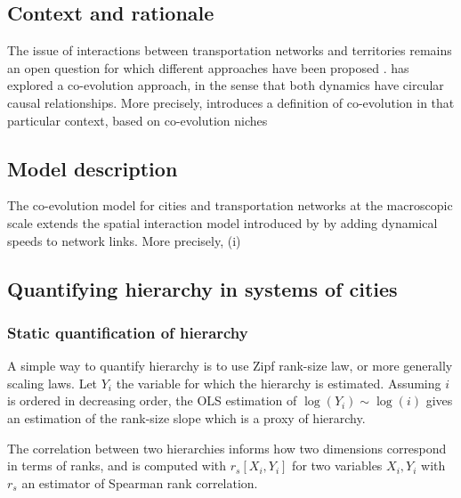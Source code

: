 \documentclass[english,fleqn,allpages]{ISTE_science}[2018/07/30]
\begin{document}
\subsection{Context and rationale}

The issue of interactions between transportation networks and territories remains an open question for which different approaches have been proposed \cite{offner1993effets,espacegeo2014effets}. \cite{raimbault2018caracterisation} has explored a co-evolution approach, in the sense that both dynamics have circular causal relationships. More precisely, \cite{raimbault2019modeling} introduces a definition of co-evolution in that particular context, based on co-evolution niches \cite{holland2012signals}

\cite{raimbault2018modeling}

\subsection{Model description}

The co-evolution model for cities and transportation networks at the macroscopic scale extends the spatial interaction model introduced by \cite{raimbault2018indirect} by adding dynamical speeds to network links. More precisely, (i)  



\subsection{Quantifying hierarchy in systems of cities}


\subsubsection{Static quantification of hierarchy}

A simple way to quantify hierarchy is to use Zipf rank-size law, or more generally scaling laws. Let $Y_i$ the variable for which the hierarchy is estimated. Assuming $i$ is ordered in decreasing order, the OLS estimation of $\log \left(Y_i\right) \sim \log \left( i\right)$ gives an estimation of the rank-size slope which is a proxy of hierarchy.


The correlation between two hierarchies informs how two dimensions correspond in terms of ranks, and is computed with $r_s\left[X_i,Y_i\right]$ for two variables $X_i,Y_i$ with $r_s$ an estimator of Spearman rank correlation.
\end{document}
